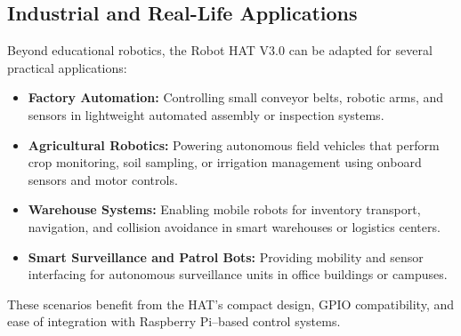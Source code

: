 \documentclass{article}
\begin{document}
	\subsection*{Industrial and Real-Life Applications}
	
	Beyond educational robotics, the Robot HAT V3.0 can be adapted for several practical applications:
	\begin{itemize}
		\item \textbf{Factory Automation:} Controlling small conveyor belts, robotic arms, and sensors in lightweight automated assembly or inspection systems.
		\item \textbf{Agricultural Robotics:} Powering autonomous field vehicles that perform crop monitoring, soil sampling, or irrigation management using onboard sensors and motor controls.
		\item \textbf{Warehouse Systems:} Enabling mobile robots for inventory transport, navigation, and collision avoidance in smart warehouses or logistics centers.
		\item \textbf{Smart Surveillance and Patrol Bots:} Providing mobility and sensor interfacing for autonomous surveillance units in office buildings or campuses.
	\end{itemize}
	
	These scenarios benefit from the HAT's compact design, GPIO compatibility, and ease of integration with Raspberry Pi–based control systems.
\end{document}
